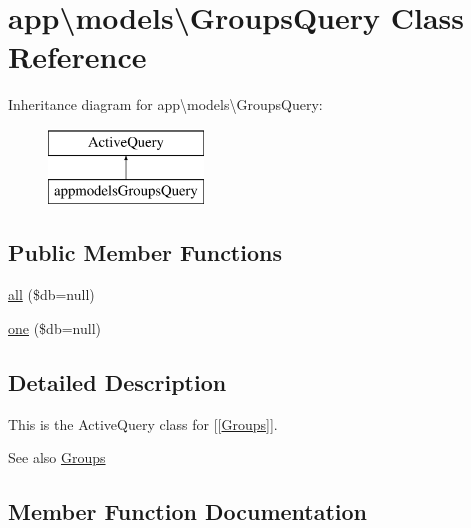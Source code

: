 \hypertarget{classapp_1_1models_1_1GroupsQuery}{}\section{app\textbackslash{}models\textbackslash{}Groups\+Query Class Reference}
\label{classapp_1_1models_1_1GroupsQuery}
Inheritance diagram for app\textbackslash{}models\textbackslash{}Groups\+Query\+:\begin{figure}[H]
\begin{center}
\leavevmode
\includegraphics[height=2.000000cm]{classapp_1_1models_1_1GroupsQuery}
\end{center}
\end{figure}
\subsection*{Public Member Functions}
\begin{DoxyCompactItemize}
\item 
\hyperlink{classapp_1_1models_1_1GroupsQuery_a1d10ddb43497e1cf296db0fda4baa9cc}{all} (\$db=null)
\item 
\hyperlink{classapp_1_1models_1_1GroupsQuery_a50e817175f16850d7f7db59cffbb11b7}{one} (\$db=null)
\end{DoxyCompactItemize}


\subsection{Detailed Description}
This is the Active\+Query class for \mbox{[}\mbox{[}\hyperlink{classapp_1_1models_1_1Groups}{Groups}\mbox{]}\mbox{]}.

\begin{DoxySeeAlso}{See also}
\hyperlink{classapp_1_1models_1_1Groups}{Groups} 
\end{DoxySeeAlso}


\subsection{Member Function Documentation}
